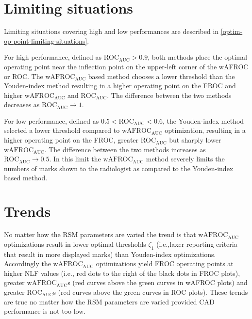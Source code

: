 \documentclass[
]{book}
\begin{document}
\hypertarget{optim-op-point-vary-nu-limiting-situations}{%
\section{Limiting situations}\label{optim-op-point-vary-nu-limiting-situations}}

Limiting situations covering high and low performances are described in \ref{optim-op-point-limiting-situations}.

For high performance, defined as \(\text{ROC}_\text{AUC} > 0.9\), both methods place the optimal operating point near the inflection point on the upper-left corner of the wAFROC or ROC. The \(\text{wAFROC}_\text{AUC}\) based method chooses a lower threshold than the Youden-index method resulting in a higher operating point on the FROC and higher \(\text{wAFROC}_\text{AUC}\) and \(\text{ROC}_\text{AUC}\). The difference between the two methods decreases as \(\text{ROC}_\text{AUC} \rightarrow 1\).

For low performance, defined as \(0.5 < \text{ROC}_\text{AUC} < 0.6\), the Youden-index method selected a lower threshold compared to \(\text{wAFROC}_\text{AUC}\) optimization, resulting in a higher operating point on the FROC, greater \(\text{ROC}_\text{AUC}\) but sharply lower \(\text{wAFROC}_\text{AUC}\). The difference between the two methods increases as \(\text{ROC}_\text{AUC} \rightarrow 0.5\). In this limit the \(\text{wAFROC}_\text{AUC}\) method severely limits the numbers of marks shown to the radiologist as compared to the Youden-index based method.

\hypertarget{optim-op-point-trends}{%
\section{Trends}\label{optim-op-point-trends}}

No matter how the RSM parameters are varied the trend is that \(\text{wAFROC}_\text{AUC}\) optimizations result in lower optimal thresholds \(\zeta_1\) (i.e.,laxer reporting criteria that result in more displayed marks) than Youden-index optimizations. Accordingly the \(\text{wAFROC}_\text{AUC}\) optimizations yield FROC operating points at higher NLF values (i.e., red dots to the right of the black dots in FROC plots), greater \(\text{wAFROC}_\text{AUC}\)s (red curves above the green curves in wAFROC plots) and greater \(\text{ROC}_\text{AUC}\)s (red curves above the green curves in ROC plots). These trends are true no matter how the RSM parameters are varied provided CAD performance is not too low.
\end{document}
